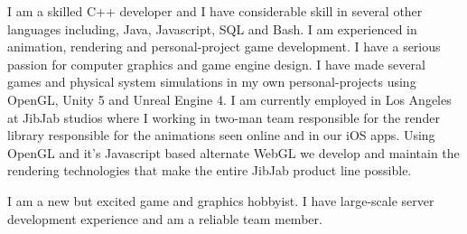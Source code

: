I am a skilled C++ developer and I have considerable skill in several other languages including, Java, Javascript, SQL and Bash.
I am experienced in animation, rendering and personal-project game development.
I have a serious passion for computer graphics and game engine design.
I have made several games and physical system simulations in my own personal-projects using OpenGL, Unity 5 and Unreal Engine 4.
I am currently employed in Los Angeles at JibJab studios where I working in two-man team responsible for the render library responsible for the animations seen online and in our iOS apps.
Using OpenGL and it's Javascript based alternate WebGL we develop and maintain the rendering technologies that make the entire JibJab product line possible. 

I am a new but excited game and graphics hobbyist.
I have large-scale server development experience and am a reliable team member.




